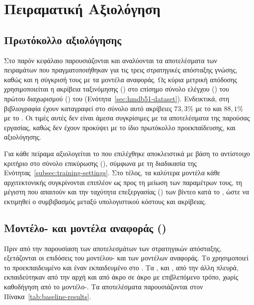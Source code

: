 \chapter{Πειραματική Αξιολόγηση}
\label{ch:experiments}

\section{Πρωτόκολλο αξιολόγησης}
\label{sec:protocol}

Στο παρόν κεφάλαιο παρουσιάζονται και αναλύονται τα αποτελέσματα των
πειραμάτων που πραγματοποιήθηκαν για τις τρεις στρατηγικές απόσταξης
γνώσης, καθώς και η σύγκρισή τους με τα μοντέλα αναφοράς. Ως κύρια μετρική απόδοσης χρησιμοποιείται η ακρίβεια ταξινόμησης
() στο επίσημο σύνολο ελέγχου () του πρώτου
διαχωρισμού () του 
(Ενότητα~\ref{sec:hmdb51-dataset}). Ενδεικτικά, στη βιβλιογραφία έχουν καταγραφεί στο σύνολο αυτό ακρίβειες
\(73{,}3\%\) με το  \cite{tong2022videomae} και
\(88{,}1\%\) με το  \cite{wang2023videomaev2}. Οι τιμές αυτές δεν είναι άμεσα συγκρίσιμες με τα αποτελέσματα της
παρούσας εργασίας, καθώς δεν έχουν προκύψει με το ίδιο πρωτόκολλο
προεκπαίδευσης,  και αξιολόγησης.

Για κάθε πείραμα αξιολογείται το
 που επιλέχθηκε αποκλειστικά με βάση το αντίστοιχο
κριτήριο στο σύνολο επικύρωσης (), σύμφωνα με τη
διαδικασία της Ενότητας~\ref{subsec:training-settings}. Στο τέλος, τα
καλύτερα μοντέλα κάθε αρχιτεκτονικής συγκρίνονται επιπλέον ως προς τη
μείωση των παραμέτρων τους, τη μέγιστη  που απαιτούν και την
ταχύτητα επεξεργασίας () των βίντεο κατά το
, ώστε να εκτιμηθεί ο συμβιβασμός μεταξύ υπολογιστικού
κόστους και ακρίβειας.

\section{Μοντέλο- και μοντέλα αναφοράς ()}
\label{sec:teacher-baseline-results} 

Πριν από την παρουσίαση των αποτελεσμάτων των στρατηγικών απόσταξης,
εξετάζονται οι επιδόσεις του μοντέλου- και των μοντέλων
αναφοράς. Το  χρησιμοποιεί το προεκπαιδευμένο
 και έναν  εκπαιδευμένο στο
. Τα ,  και , από την άλλη πλευρά, εκπαιδεύτηκαν από την αρχή και από άκρο σε άκρο με επιβλεπόμενο τρόπο,
χωρίς καθοδήγηση από το μοντέλο-. Τα αποτελέσματα
παρουσιάζονται στον Πίνακα~\ref{tab:baseline-results}.

